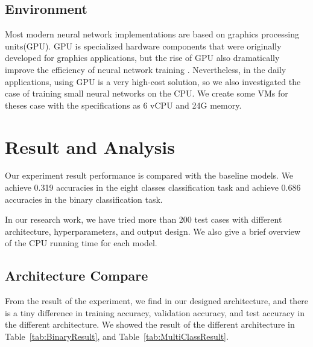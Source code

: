\documentclass{article}
\begin{document}
\subsection{Environment}
Most modern neural network implementations are based on graphics processing units(GPU). GPU is specialized hardware components that were originally developed for graphics applications, but the rise of GPU also dramatically improve the efficiency of neural network training \citep{DBLP:journals/corr/abs-1907-10701}.
Nevertheless, in the daily applications, using GPU is a very high-cost solution, so we also investigated the case of training small neural networks on the CPU. We create some VMs for theses case with the specifications as 6 vCPU and 24G memory.
%
\section{Result and Analysis}
\label{Result and Analysis}
Our experiment result performance is compared with the baseline models. We achieve 0.319 accuracies in the eight classes classification task and achieve 0.686 accuracies in the binary classification task.

In our research work, we have tried more than 200 test cases with different architecture, hyperparameters, and output design. We also give a brief overview of the CPU running time for each model.

\subsection{Architecture Compare}
From the result of the experiment, we find in our designed architecture, and there is a tiny difference in training accuracy, validation accuracy, and test accuracy in the different architecture. We showed the result of the different architecture in Table~\ref{tab:BinaryResult}, and Table~\ref{tab:MultiClassResult}.
\end{document}
